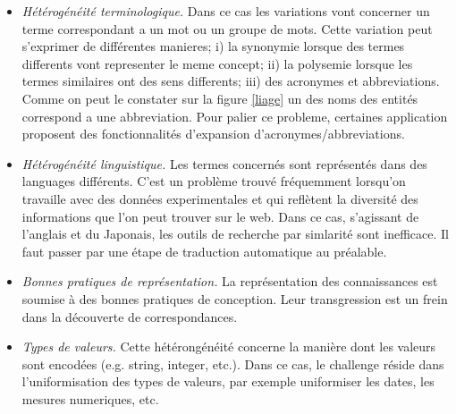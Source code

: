 \begin{itemize}
\item \textit{Hétérogénéité terminologique.} Dans ce cas les variations vont concerner un terme correspondant a un mot ou un groupe de mots. Cette variation peut s'exprimer de différentes manieres; i) la synonymie lorsque des termes differents vont representer le meme concept; ii) la polysemie lorsque les termes similaires ont des sens differents; iii) des acronymes et abbreviations. Comme on peut le constater sur la figure \ref{liage} un des noms des entités correspond a une abbreviation. Pour palier ce probleme, certaines application proposent des fonctionnalités d'expansion d'acronymes/abbreviations.\\
\item \textit{Hétérogénéité linguistique.}  Les termes concernés sont représentés dans des languages différents. C'est un problème trouvé fréquemment lorsqu'on travaille avec des données experimentales et qui reflètent la diversité des informations que l'on peut trouver sur le web. Dans ce cas, s'agissant de l'anglais et du Japonais, les outils de recherche par simlarité sont inefficace. Il faut passer par une étape de traduction automatique au préalable. \\
\item \textit{Bonnes pratiques de représentation.} La représentation des connaissances est soumise à des bonnes pratiques de conception. Leur transgression est un frein dans la découverte de correspondances.\\
\item \textit{Types de valeurs.} Cette hétérongénéité concerne la manière dont les valeurs sont encodées (e.g. string, integer, etc.). Dans ce cas, le challenge réside dans l'uniformisation des types de valeurs, par exemple uniformiser les dates, les mesures numeriques, etc.\\
\end{itemize}

